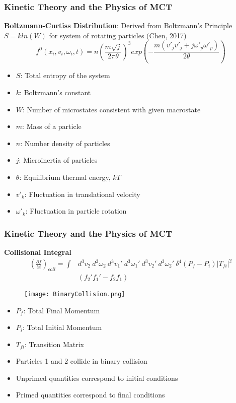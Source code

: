 \documentclass{beamer}
\begin{document}
\begin{frame}
 \frametitle{Kinetic Theory and the Physics of MCT}
 \textbf{Boltzmann-Curtiss Distribution}: Derived from Boltzmann's Principle $S 
= kln(W)$ for system of rotating particles (Chen, 2017)
\begin{equation*}
f^{0}(x_{i}, v_{i}, \omega_{i}, t) = n(\frac{m\sqrt{j}}{2\pi 
\theta})^3 exp(-\frac{m(v'_{j}v'_{j} + j\omega'_{p}\omega'_{p})}{2\theta})
\end{equation*}
\small
\begin{multicols}{2}
\begin{itemize}
\item $S$: Total entropy of the system
\item $k$: Boltzmann's constant
\item $W$: Number of microstates consistent with given macrostate
\item $m$: Mass of a particle
\item $n$: Number density of particles
\item $j$: Microinertia of particles
\item $\theta$: Equilibrium thermal energy, $kT$ 
\item $v'_k$: Fluctuation in translational velocity
\item $\omega'_{k}$: Fluctuation in particle rotation
\end{itemize}
\end{multicols}
\end{frame}


\begin{frame}
 \frametitle{Kinetic Theory and the Physics of MCT}
 \textbf{\large Collisional Integral}
  \begin{align*}
 \label{collisionintegral}
 (\frac{\partial f}{\partial t})_{coll} =  \int &d^3 v_2 \ d^3\omega_2 \ 
d^3v_1' \ d^3\omega_1' \ d^3v_2' \ d^3\omega_2' \ \delta^4(P_f - 
P_i)\left|T_{fi}\right|^2 \\ &(f_2'f_1' - f_2 f_1)
\end{align*}
 \begin{multicols}{2}
 \begin{figure}
  \texttt{[image: BinaryCollision.png]}
 \end{figure}
\begin{itemize}
\small
\item $P_{f}$: Total Final Momentum  
\item $P_{i}$: Total Initial Momentum
\item $T_{fi}$: Transition Matrix
\item Particles 1 and 2 collide in binary collision
\item Unprimed quantities correspond to initial conditions
\item Primed quantities correspond to final conditions
\end{itemize}
\end{multicols}
\end{frame}
\end{document}
